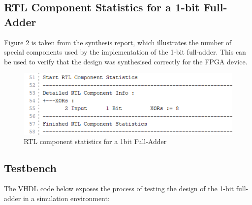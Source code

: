 \documentclass[11pt]{article}
\begin{document}
\subsection {RTL Component Statistics for a 1-bit Full-Adder }

Figure 2 is taken from the synthesis report, which illustrates the number of special components used by the implementation of the 1-bit full-adder. This can be used to verify that the design was synthesised correctly for the FPGA device.



\begin{figure}[ht]
    \centering
    \includegraphics[width=0.8 \textwidth]{RTL_component_statistics.png}
    \caption{RTL component statistics for a 1bit Full-Adder}
    \label{fig:isa}
\end{figure}



\newpage
\subsection{Testbench}

The VHDL code below exposes the process of testing the design of the 1-bit full-adder in a simulation environment:
\end{document}

